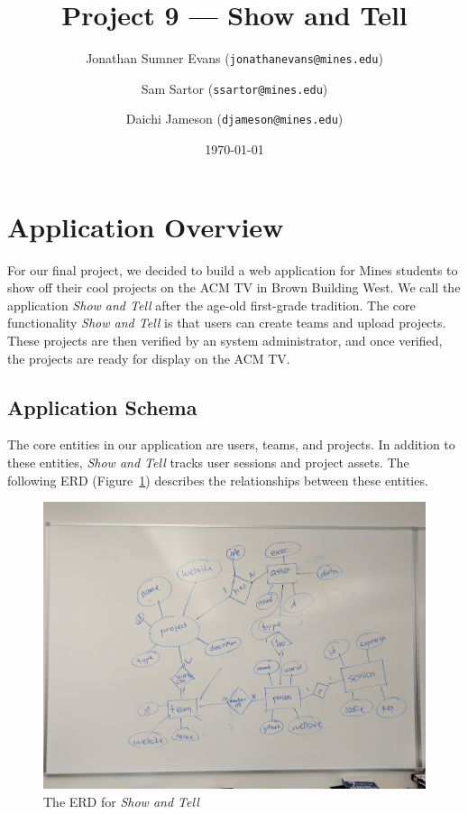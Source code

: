 \documentclass[12pt]{article}
\title{Project 9 --- Show and Tell}
\author{
    Jonathan Sumner Evans (\texttt{jonathanevans@mines.edu})
    \and
    Sam Sartor (\texttt{ssartor@mines.edu})
    \and
    Daichi Jameson (\texttt{djameson@mines.edu})
}
\date{\today}
\newcommand{\app}{\textit{Show and Tell}\xspace}
\begin{document}
\maketitle

\section{Application Overview}
For our final project, we decided to build a web application for Mines students
to show off their cool projects on the ACM TV in Brown Building West. We call
the application \app after the age-old first-grade tradition. The core
functionality \app is that users can create teams and upload projects. These
projects are then verified by an system administrator, and once verified, the
projects are ready for display on the ACM TV.

\subsection{Application Schema}
The core entities in our application are users, teams, and projects. In addition
to these entities, \app tracks user sessions and project assets. The following
ERD (Figure~\ref{fig:erd}) describes the relationships between these entities.

\begin{figure}[H]
    \includegraphics[width=\textwidth]{erd}
    \caption{The ERD for \app}
    \label{fig:erd}
\end{figure}

%
%
\end{document}

